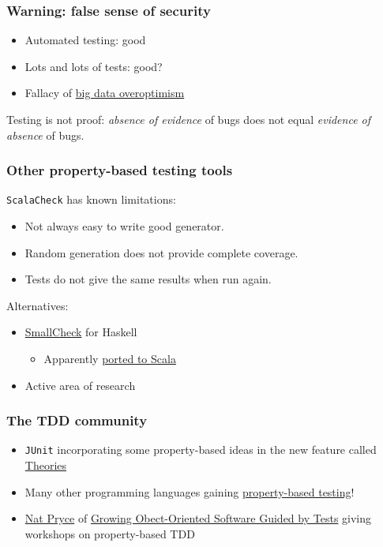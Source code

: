 \begin{frame}
  \frametitle{Warning: false sense of security}

  \begin{itemize}
    \item Automated testing: good
    \item Lots and lots of tests: good?
    \item Fallacy of \href{http://radar.oreilly.com/2013/04/data-skepticism.html}{big data overoptimism}
  \end{itemize}

  Testing is not proof: \emph{absence of evidence} of bugs does not equal \emph{evidence of absence} of bugs.
\end{frame}

\begin{frame}
  \frametitle{Other property-based testing tools}

  \texttt{ScalaCheck} has known limitations:
  \begin{itemize}
    \item Not always easy to write good generator.
    \item Random generation does not provide complete coverage.
    \item Tests do not give the same results when run again.
  \end{itemize}

  Alternatives:
  \begin{itemize}
    \item \href{http://www.cs.york.ac.uk/fp/smallcheck/}{SmallCheck} for Haskell
      \begin{itemize}
        \item Apparently \href{https://github.com/dwhjames/smallcheck4scala}{ported to Scala}
      \end{itemize}
    \item Active area of research
  \end{itemize}
\end{frame}

\begin{frame}
  \frametitle{The TDD community}
  
  \begin{itemize}
    \item \texttt{JUnit} incorporating some property-based ideas in the new feature called \href{https://github.com/junit-team/junit/wiki/Theories}{Theories}
    \item Many other programming languages gaining \href{http://en.wikipedia.org/wiki/QuickCheck}{property-based testing}!
    \item \href{http://www.natpryce.com/}{Nat Pryce} of \href{http://www.growing-object-oriented-software.com/}{Growing Obect-Oriented Software Guided by Tests} giving workshops on property-based TDD
  \end{itemize}
\end{frame}

